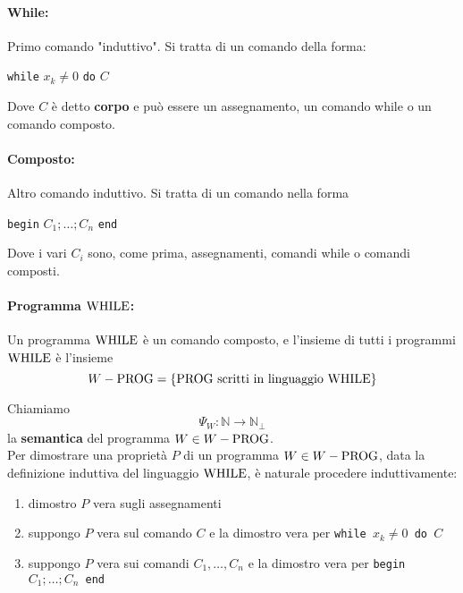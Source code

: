 \paragraph{While:} Primo comando "induttivo". Si tratta di un comando della forma: 
\begin{center}
	\texttt{while} $x_k \neq 0$ \texttt{do} $C$
\end{center}
Dove $C$ è detto \textbf{corpo} e può essere un assegnamento, un comando while o un comando composto.

\paragraph{Composto:} Altro comando induttivo. Si tratta di un comando nella forma
\begin{center}
	\texttt{begin} $C_1; \dots; C_n$ \texttt{end}
\end{center}
Dove i vari $C_i$ sono, come prima, assegnamenti, comandi while o comandi composti.\\

\paragraph{Programma $\text{WHILE}$:} Un programma $\text{WHILE}$ è un comando composto, e l'insieme di tutti i programmi $\text{WHILE}$ è l'insieme
$$ W-\text{PROG} = \{\text{PROG} \text{ scritti in linguaggio } \text{WHILE} \} $$

Chiamiamo 
$$ \Psi_W : \mathbb{N} \rightarrow \mathbb{N}_\bot $$
la \textbf{semantica} del programma $W \in W-\text{PROG}$.\\

Per dimostrare una proprietà $P$ di un programma $W \in W-\text{PROG}$, data la definizione induttiva del linguaggio $\text{WHILE}$, è naturale procedere induttivamente: 
\begin{enumerate}
	\item dimostro $P$ vera sugli assegnamenti 
	\item suppongo $P$ vera sul comando $C$ e la dimostro vera per \texttt{while $x_k \neq 0$ do $C$}
	\item suppongo $P$ vera sui comandi $C_1, \dots, C_n$ e la dimostro vera per \texttt{begin $C_1; \dots; C_n$ end}
\end{enumerate}

